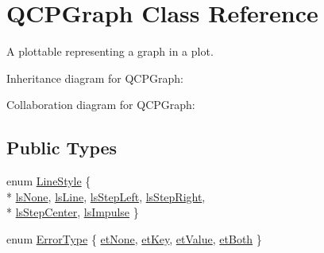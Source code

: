 \hypertarget{classQCPGraph}{}\section{Q\+C\+P\+Graph Class Reference}
\label{classQCPGraph}


A plottable representing a graph in a plot.  




Inheritance diagram for Q\+C\+P\+Graph\+:


Collaboration diagram for Q\+C\+P\+Graph\+:
\subsection*{Public Types}
\begin{DoxyCompactItemize}
\item 
enum \hyperlink{classQCPGraph_ad60175cd9b5cac937c5ee685c32c0859}{Line\+Style} \{ \\*
\hyperlink{classQCPGraph_ad60175cd9b5cac937c5ee685c32c0859aea9591b933733cc7b20786b71e60fa04}{ls\+None}, 
\hyperlink{classQCPGraph_ad60175cd9b5cac937c5ee685c32c0859a3c42a27b15aa3c92d399082fad8b7515}{ls\+Line}, 
\hyperlink{classQCPGraph_ad60175cd9b5cac937c5ee685c32c0859ae10568bda57836487d9dec5eba1d6c6e}{ls\+Step\+Left}, 
\hyperlink{classQCPGraph_ad60175cd9b5cac937c5ee685c32c0859a9c37951f7d11aa070100fd16f2935c9e}{ls\+Step\+Right}, 
\\*
\hyperlink{classQCPGraph_ad60175cd9b5cac937c5ee685c32c0859a5adf7b04da215a40a764c21294ea7366}{ls\+Step\+Center}, 
\hyperlink{classQCPGraph_ad60175cd9b5cac937c5ee685c32c0859aa3b358b4ae7cca94aceeb8e529c12ebb}{ls\+Impulse}
 \}
\item 
enum \hyperlink{classQCPGraph_ad23b514404bd2cb3216f57c90904d6af}{Error\+Type} \{ \hyperlink{classQCPGraph_ad23b514404bd2cb3216f57c90904d6afaeae745e7cc1766bb8546e35d4b76a711}{et\+None}, 
\hyperlink{classQCPGraph_ad23b514404bd2cb3216f57c90904d6afa2a5d89cd76fb8b6b18d71b8f6f6c0f43}{et\+Key}, 
\hyperlink{classQCPGraph_ad23b514404bd2cb3216f57c90904d6afa147022ccdc49f6bd48f904cb4f61872e}{et\+Value}, 
\hyperlink{classQCPGraph_ad23b514404bd2cb3216f57c90904d6afa761cb7d61670c1e2efecccd8974409ab}{et\+Both}
 \}
\end{DoxyCompactItemize}
